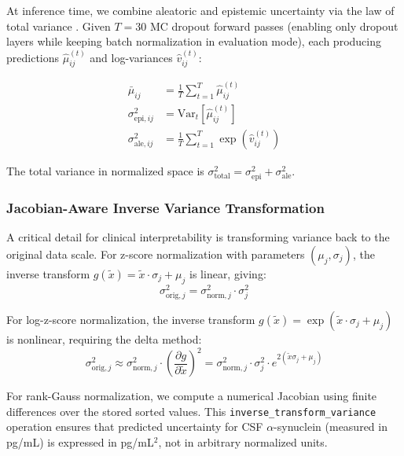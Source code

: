 \documentclass[journal,twoside,web]{ieeecolor}
\begin{document}
At inference time, we combine aleatoric and epistemic uncertainty via the law of total variance \cite{kendall2017uncertainties}. Given $T = 30$ MC dropout forward passes (enabling only dropout layers while keeping batch normalization in evaluation mode), each producing predictions $\hat{\mu}_{ij}^{(t)}$ and log-variances $\hat{v}_{ij}^{(t)}$:

\begin{align}
    \bar{\mu}_{ij} &= \frac{1}{T}\sum_{t=1}^{T} \hat{\mu}_{ij}^{(t)} \label{eq:mc_mean} \\
    \sigma^2_{\text{epi},ij} &= \text{Var}_t[\hat{\mu}_{ij}^{(t)}] \label{eq:epistemic} \\
    \sigma^2_{\text{ale},ij} &= \frac{1}{T}\sum_{t=1}^{T} \exp(\hat{v}_{ij}^{(t)}) \label{eq:aleatoric}
\end{align}

The total variance in normalized space is $\sigma^2_{\text{total}} = \sigma^2_{\text{epi}} + \sigma^2_{\text{ale}}$.

\subsubsection{Jacobian-Aware Inverse Variance Transformation}

A critical detail for clinical interpretability is transforming variance back to the original data scale. For z-score normalization with parameters $(\mu_j, \sigma_j)$, the inverse transform $g(\tilde{x}) = \tilde{x} \cdot \sigma_j + \mu_j$ is linear, giving:
\begin{equation}
    \sigma^2_{\text{orig},j} = \sigma^2_{\text{norm},j} \cdot \sigma_j^2
\end{equation}

For log-z-score normalization, the inverse transform $g(\tilde{x}) = \exp(\tilde{x} \cdot \sigma_j + \mu_j)$ is nonlinear, requiring the delta method:
\begin{equation}
    \sigma^2_{\text{orig},j} \approx \sigma^2_{\text{norm},j} \cdot \left(\frac{\partial g}{\partial \tilde{x}}\right)^2 = \sigma^2_{\text{norm},j} \cdot \sigma_j^2 \cdot e^{2(\tilde{x}\sigma_j + \mu_j)}
\end{equation}

For rank-Gauss normalization, we compute a numerical Jacobian using finite differences over the stored sorted values. This \texttt{inverse\_transform\_variance} operation ensures that predicted uncertainty for CSF $\alpha$-synuclein (measured in pg/mL) is expressed in pg/mL$^2$, not in arbitrary normalized units.
\end{document}
